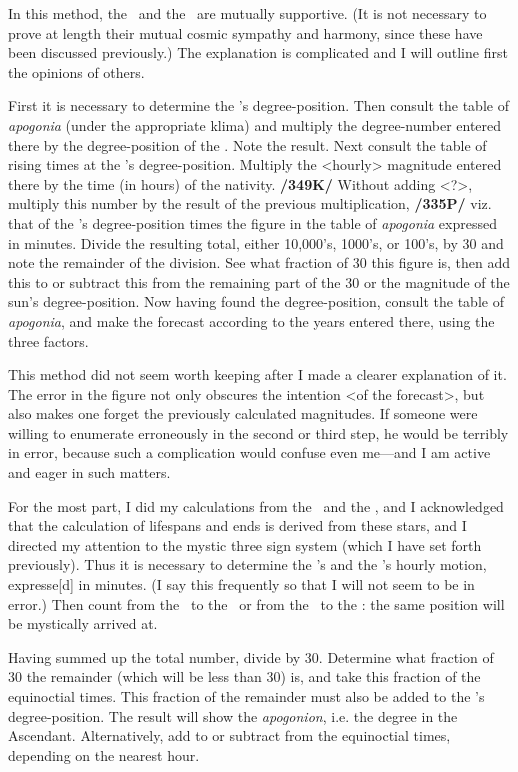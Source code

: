 In this method, the \Sun\, and the \Moon\, are mutually supportive. (It is not necessary to prove at length their mutual cosmic sympathy and harmony, since these have been discussed previously.) The explanation
is complicated and I will outline first the opinions of others. 

First it is necessary to determine the \Sun’s degree-position. Then consult the table of \textit{apogonia} (under the appropriate klima) and multiply the degree-number entered there by the degree-position of the \Sun. Note the result. Next consult the table of rising times at the \Sun’s degree-position. Multiply the <hourly> magnitude entered there by the time (in hours) of the nativity. \textbf{/349K/} Without adding <?>, multiply this number by the result of the previous multiplication, \textbf{/335P/} viz. that of the \Sun’s degree-position times the figure in the table of \textit{apogonia} expressed in minutes. Divide the resulting total, either 10,000’s, 1000’s, or 100’s, by 30 and note the remainder of the division. See what fraction of 30 this figure is, then add this to or subtract this from the remaining part of the 30 or the magnitude of the sun’s degree-position. Now having found the degree-position, consult the table of \textit{apogonia}, and make the forecast according to the years entered there, using the three factors.

This method did not seem worth keeping after I made a clearer explanation of it. The error in the figure not only obscures the intention <of the forecast>, but also makes one forget the previously calculated
magnitudes. If someone were willing to enumerate erroneously in the second or third step, he would be terribly in error, because such a complication would confuse even me—and I am active and eager in such matters.

For the most part, I did my calculations from the \Sun\, and the \Moon, and I acknowledged that the calculation of lifespans and ends is derived from these stars, and I directed my attention to the mystic three sign
system (which I have set forth previously). Thus it is necessary to determine the \Sun’s and the \Moon’s hourly motion, expresse[d] in minutes. (I say this frequently so that I will not seem to be in error.)
Then count from the \Sun\, to the \Moon\, or from the \Moon\, to the \Sun: the same position will be mystically arrived at. 

Having summed up the total number, divide by 30. Determine what fraction of 30 the remainder (which will be less than 30) is, and take this fraction of the equinoctial times. This fraction of the remainder must also be added to the \Sun’s degree-position. The result will show the \textit{apogonion}, i.e. the degree in the Ascendant. Alternatively, add to or subtract from the equinoctial times, depending on the
nearest hour.

